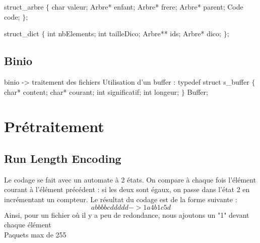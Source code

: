 \documentclass{beamer}
\begin{document}
\begin{frame}
 struct\_arbre $\{$ \newline
	char valeur; \newline
	Arbre* enfant; \newline
	Arbre* frere; \newline
	Arbre* parent; \newline
	Code code; \newline
$\};$
\end{frame}
\begin{frame}

struct\_dict $\{$ \newline
	int nbElements;	\newline	
	int tailleDico;	\newline	
	Arbre** ids;	\newline	
	Arbre* dico;	\newline	
$\};$

\end{frame}


\subsection{Binio}
\begin{frame}
 binio -> traitement des fichiers\newline
 \newline
 Utilisation d'un buffer :\newline
 \newline
 typedef struct s\_buffer $\{$ \newline
	char* content; \newline
	char* courant; \newline
	int significatif; \newline
	int longeur; \newline
$\}$ Buffer;
 
\end{frame}


\section{Prétraitement}

\subsection{Run Length Encoding}

\begin{frame}
Le codage se fait avec un automate à 2 états. On compare à chaque fois l'élément courant à l'élément précédent : si les deux sont égaux, on passe dans l'état 2 en incrémentant un compteur.
Le résultat du codage est de la forme suivante :\\
	$$abbbbcddddd -> 1a4b1c5d$$
Ainsi, pour un fichier où il y a peu de redondance, nous ajoutons un "1" devant chaque élément\\
Paquets max de 255
\end{frame}
\end{document}
